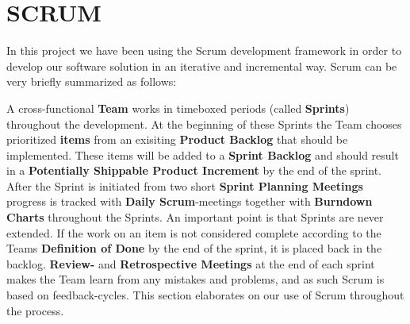\section{SCRUM}

In this project we have been using the Scrum development framework in order to develop our software solution in an iterative and incremental way. Scrum can be very briefly summarized as follows:

A cross-functional \textbf{Team} works in timeboxed periods (called \textbf{Sprints}) throughout the development. At the beginning of these Sprints the Team chooses prioritized \textbf{items} from an exisiting \textbf{Product Backlog} that should be implemented. These items will be added to a \textbf{Sprint Backlog} and should result in a \textbf{ Potentially Shippable Product Increment} by the end of the sprint.
After the Sprint is initiated from two short \textbf{Sprint Planning Meetings} progress is tracked with \textbf{Daily Scrum}-meetings together with \textbf{Burndown Charts} throughout the Sprints. An important point is that Sprints are never extended. If the work on an item is not considered complete according to the Teams \textbf{Definition of Done} by the end of the sprint, it is placed back in the backlog.
\textbf{Review-} and \textbf{Retrospective Meetings} at the end of each sprint makes the Team learn from any mistakes and problems, and as such Scrum is based on feedback-cycles.
This section elaborates on our use of Scrum throughout the process.







